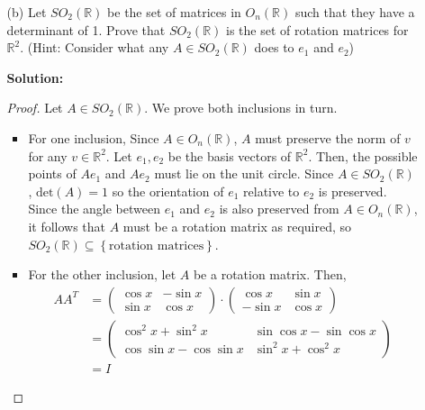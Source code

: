 \documentclass[letterpaper,12pt]{article}
\newcommand{\set}[1]{\left\{ #1 \right\}}
\theoremstyle{definition}
\begin{document}
\begin{enumerate}
    \item[] \begin{enumerate}
        \item[(b)] Let $SO_2(\mathbb{R})$ be the set of matrices in $ O_n(\mathbb{R})$ such that they have a determinant of 1. Prove that $SO_2(\mathbb{R})$ is the set of rotation matrices for $\mathbb{R}^2$. (Hint: Consider what any $A \in SO_2(\mathbb{R})$ does to $e_1$ and $e_2$)
        \begin{mdframed}
            \textbf{Solution:} \begin{proof}
                Let $A \in SO_2(\mathbb{R})$. We prove both inclusions in turn. \begin{itemize}
                    \item For one inclusion, Since $A \in O_n(\mathbb{R})$, $A$ must preserve the norm of $v$ for any $v \in \mathbb{R}^2$. Let $e_1,e_2$ be the basis vectors of $\mathbb{R}^2$. Then, the possible points of $Ae_1$ and $Ae_2$ must lie on the unit circle. Since $A \in SO_2(\mathbb{R})$, $\mathrm{det}(A) = 1$ so the orientation of $e_1$ relative to $e_2$ is preserved. Since the angle between $e_1$ and $e_2$ is also preserved from $A \in O_n(\mathbb{R})$, it follows that $A$ must be a rotation matrix as required, so $SO_2(\mathbb{R}) \subseteq \set{\text{rotation matrices}}$. 
                    \item For the other inclusion, let $A$ be a rotation matrix. Then, \begin{align*}
                         AA^T &= \begin{pmatrix}
                            \cos x & -\sin x \\ \sin x & \cos x
                        \end{pmatrix} \cdot  \begin{pmatrix}
                            \cos x & \sin x \\ -\sin x & \cos x
                        \end{pmatrix} \\
                        &= \begin{pmatrix}
                            \cos^2 x + \sin^2 x & \sin \cos x - \sin \cos x\\ \cos \sin x - \cos \sin x & \sin^2 x + \cos^2 x
                        \end{pmatrix} \\
                        &= I
                    \end{align*}

\end{itemize}
\end{proof}
\end{mdframed}
\end{enumerate}
\end{enumerate}
\end{document}
